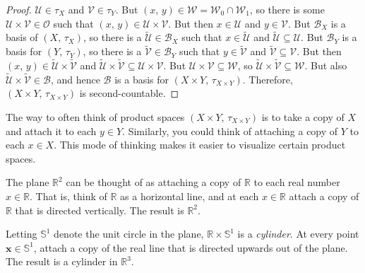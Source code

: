 \documentclass{article}
\theoremstyle{plain}
\theoremstyle{normal}
\newenvironment{example}{%
    \pushQED{\qed}\renewcommand{\qedsymbol}{$\blacksquare$}\examplex%
}{%
    \popQED\endexamplex%
}
\begin{document}
\begin{proof}
            $\mathcal{U}\in\tau_{X}$ and $\mathcal{V}\in\tau_{Y}$. But
            $(x,\,y)\in\mathcal{W}=\mathcal{W}_{0}\cap\mathcal{W}_{1}$,
            so there is some $\mathcal{U}\times\mathcal{V}\in\mathcal{O}$
            such that $(x,\,y)\in\mathcal{U}\times\mathcal{V}$. But then
            $x\in\mathcal{U}$ and $y\in\mathcal{V}$. But
            $\mathcal{B}_{X}$ is a basis of $(X,\,\tau_{X})$, so there is a
            $\tilde{\mathcal{U}}\in\mathcal{B}_{X}$ such that
            $x\in\tilde{\mathcal{U}}$ and
            $\tilde{\mathcal{U}}\subseteq\mathcal{U}$. But $\mathcal{B}_{Y}$ is
            a basis for $(Y,\,\tau_{Y})$, so there is a
            $\tilde{\mathcal{V}}\in\mathcal{B}_{Y}$ such that
            $y\in\tilde{\mathcal{V}}$ and
            $\tilde{\mathcal{V}}\subseteq\mathcal{V}$. But then
            $(x,\,y)\in\tilde{\mathcal{U}}\times\tilde{\mathcal{V}}$ and
            $\tilde{\mathcal{U}}\times\tilde{\mathcal{V}}\subseteq\mathcal{U}\times\mathcal{V}$.
            But $\mathcal{U}\times\mathcal{V}\subseteq\mathcal{W}$, so
            $\tilde{\mathcal{U}}\times\tilde{\mathcal{V}}\subseteq\mathcal{W}$.
            But also
            $\tilde{\mathcal{U}}\times\tilde{\mathcal{V}}\in\mathcal{B}$, and
            hence $\mathcal{B}$ is a basis for
            $(X\times{Y},\,\tau_{X\times{Y}})$. Therefore,
            $(X\times{Y},\,\tau_{X\times{Y}})$ is second-countable.
        \end{proof}
        The way to often think of product spaces
        $(X\times{Y},\,\tau_{X\times{Y}})$ is to take a copy of
        $X$ and attach it to each $y\in{Y}$. Similarly, you could think of
        attaching a copy of $Y$ to each $x\in{X}$. This mode of thinking makes
        it easier to visualize certain product spaces.
        \begin{example}
            The plane $\mathbb{R}^{2}$ can be thought of as attaching a
            copy of $\mathbb{R}$ to each real number $x\in\mathbb{R}$.
            That is, think of $\mathbb{R}$ as a horizontal line, and at
            each $x\in\mathbb{R}$ attach a copy of $\mathbb{R}$ that is
            directed vertically. The result is
            $\mathbb{R}^{2}$.
        \end{example}
        \begin{example}
            Letting $\mathbb{S}^{1}$ denote the unit circle in the plane,
            $\mathbb{R}\times\mathbb{S}^{1}$ is a \textit{cylinder}. At every
            point $\mathbf{x}\in\mathbb{S}^{1}$, attach a copy of the real
            line that is directed upwards out of the plane. The result is a
            cylinder in $\mathbb{R}^{3}$.
        \end{example}
\end{document}
